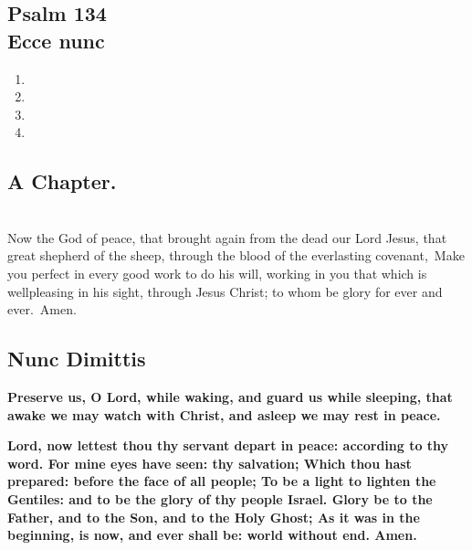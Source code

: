 \subsection{Psalm 134\\
Ecce nunc}
\begin{enumerate}
\item {}
\item {}
\item {}
\item {}
\end{enumerate}

\subsection{A Chapter.}

\\
Now the God of peace, that brought again from the dead our Lord Jesus, that great shepherd of the sheep, through the blood of the everlasting covenant,\
Make you perfect in every good work to do his will, working in you that which is wellpleasing in his sight, through Jesus Christ; to whom be glory for ever and ever.\
Amen.


\R{I commend my spirit.}

\subsection{Nunc Dimittis}

\textbf{Preserve us, O Lord, while waking,
and guard us while sleeping,
that awake we may watch with Christ,
and asleep we may rest in peace.}

\textbf{Lord, now lettest thou thy servant depart in peace: according to thy word.
For mine eyes have seen: thy salvation;
Which thou hast prepared: before the face of all people;
To be a light to lighten the Gentiles: and to be the glory of thy people Israel.
Glory be to the Father, and to the Son, and to the Holy Ghost;
As it was in the beginning, is now, and ever shall be: world without end. Amen.}

